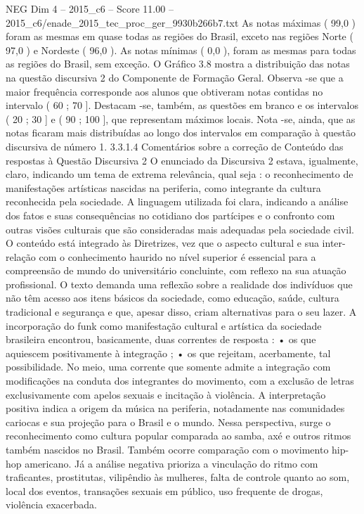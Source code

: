 \begin{textsample}{NEG Dim 4 – 2015\_c6 – Score 11.00 – 2015\_c6/enade\_2015\_tec\_proc\_ger\_9930b266b7.txt}
As notas máximas ( 99,0 ) foram as mesmas em quase todas as regiões do Brasil, exceto nas regiões Norte ( 97,0 ) e Nordeste ( 96,0 ).
As notas mínimas ( 0,0 ), foram as mesmas para todas as regiões do Brasil, sem exceção.
O Gráfico 3.8 mostra a distribuição das notas na questão discursiva 2 do Componente de Formação Geral.
Observa -se que a maior frequência corresponde aos alunos que obtiveram notas contidas no intervalo ( 60 ; 70 ].
Destacam -se, também, as questões em branco e os intervalos ( 20 ; 30 ] e ( 90 ; 100 ], que representam máximos locais.
Nota -se, ainda, que as notas ficaram mais distribuídas ao longo dos intervalos em comparação à questão discursiva de número 1. 3.3.1.4 Comentários sobre a correção de Conteúdo das respostas à Questão Discursiva 2 O enunciado da Discursiva 2 estava, igualmente, claro, indicando um tema de extrema relevância, qual seja : o reconhecimento de manifestações artísticas nascidas na periferia, como integrante da cultura reconhecida pela sociedade.
A linguagem utilizada foi clara, indicando a análise dos fatos e suas consequências no cotidiano dos partícipes e o confronto com outras visões culturais que são consideradas mais adequadas pela sociedade civil.
O conteúdo está integrado às Diretrizes, vez que o aspecto cultural e sua inter-relação com o conhecimento haurido no nível superior é essencial para a compreensão de mundo do universitário concluinte, com reflexo na sua atuação profissional.
O texto demanda uma reflexão sobre a realidade dos indivíduos que não têm acesso aos itens básicos da sociedade, como educação, saúde, cultura tradicional e segurança e que, apesar disso, criam alternativas para o seu lazer.
A incorporação do funk como manifestação cultural e artística da sociedade brasileira encontrou, basicamente, duas correntes de resposta : • os que aquiescem positivamente à integração ; • os que rejeitam, acerbamente, tal possibilidade.
No meio, uma corrente que somente admite a integração com modificações na conduta dos integrantes do movimento, com a exclusão de letras exclusivamente com apelos sexuais e incitação à violência.
A interpretação positiva indica a origem da música na periferia, notadamente nas comunidades cariocas e sua projeção para o Brasil e o mundo.
Nessa perspectiva, surge o reconhecimento como cultura popular comparada ao samba, axé e outros ritmos também nascidos no Brasil.
Também ocorre comparação com o movimento hip-hop americano.
Já a análise negativa prioriza a vinculação do ritmo com traficantes, prostitutas, vilipêndio às mulheres, falta de controle quanto ao som, local dos eventos, transações sexuais em público, uso frequente de drogas, violência exacerbada.

\end{textsample}
